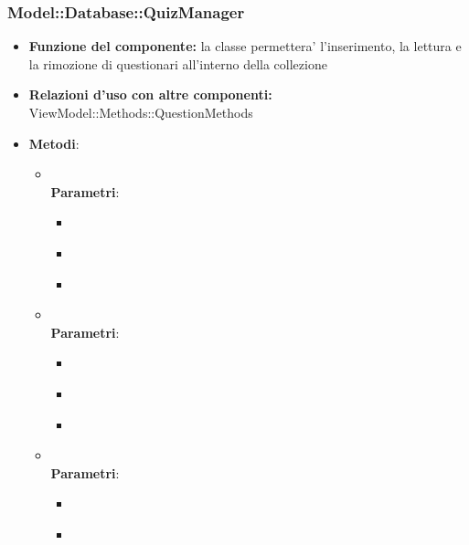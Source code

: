 \subsubsection{Model::Database::QuizManager}
\begin{itemize}
\item\textbf{Funzione del componente:} la classe permettera' l'inserimento, la lettura e la rimozione di questionari all'interno della collezione
\item\textbf{Relazioni d'uso con altre componenti:} ViewModel::Methods::QuestionMethods\\
\item\textbf{Metodi}:
\begin{itemize}
	\item{}\\
	\textbf{Parametri}:
	\begin{itemize}
		\item{}\\
		\item{}\\
		\item{}\\
	\end{itemize}
	\item{}\\
	\textbf{Parametri}:
	\begin{itemize}
		\item{}\\
		\item{}\\
		\item{}\\
	\end{itemize}
	\item{}\\
	\textbf{Parametri}:
	\begin{itemize}
		\item{}\\
		\item{}\\
	\end{itemize}
\end{itemize}
\end{itemize}

